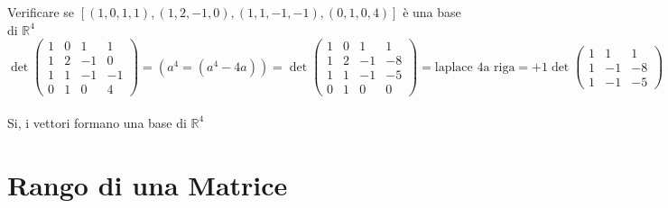 \begin{esercizio}
  Verificare se $[(1,0,1,1),(1,2,-1,0),(1,1,-1,-1),(0,1,0,4)]$ è una
  base di $\mathbb{R}^4$\\
  $\det
  \begin{pmatrix}
    1 & 0 & 1 & 1\\
    1 & 2 & -1 & 0\\
    1 & 1 & -1 & -1\\
    0 & 1 & 0 & 4
  \end{pmatrix}=(a^4=(a^4-4a))=\det
  \begin{pmatrix}
    1 & 0 & 1 & 1\\
    1 & 2 & -1 & -8\\
    1 & 1 & -1 & -5\\
    0 & 1 & 0 & 0
  \end{pmatrix}=\text{laplace 4a riga}=+1\det
  \begin{pmatrix}
    1 & 1 & 1\\
    1 & -1 & -8\\
    1 & -1 & -5
  \end{pmatrix}=\det
  \begin{pmatrix}
    2 & 1 & 1\\
    0 & -1 & -8\\
    0 & -1 & -5
  \end{pmatrix}=\text{laplace } 1^a \text{ colonna}=2\det
  \begin{pmatrix}
    -1 & -8\\
    -1 & -5
  \end{pmatrix}=2(5-8)=-6$\\\\
  Si, i vettori formano una base di $\mathbb{R}^4$
\end{esercizio}

\section{Rango di una Matrice}

